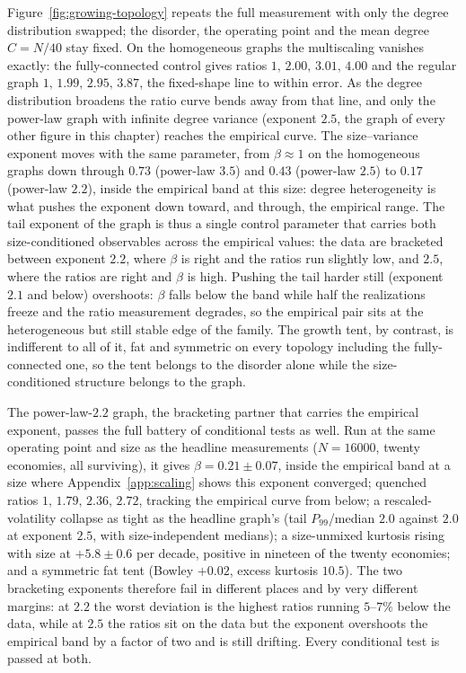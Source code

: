Figure~\ref{fig:growing-topology} repeats the full measurement with only the degree
distribution swapped; the disorder, the operating point and the mean degree $C = N/40$
stay fixed. On the homogeneous graphs the
multiscaling vanishes exactly: the fully-connected control gives ratios
$1,\,2.00,\,3.01,\,4.00$ and the regular graph $1,\,1.99,\,2.95,\,3.87$, the
fixed-shape line to within error. As the degree distribution broadens the ratio curve
bends away from that line, and only the power-law graph with infinite degree variance
(exponent $2.5$, the graph of every other figure in this chapter) reaches the empirical
curve. The size--variance exponent moves with the same parameter, from $\beta \approx 1$ on
the homogeneous graphs down through $0.73$ (power-law $3.5$) and $0.43$ (power-law $2.5$)
to $0.17$ (power-law $2.2$), inside the empirical band at this size:
degree heterogeneity is what pushes the exponent down toward, and through, the empirical
range. The tail exponent of the graph is thus a single control parameter that carries both
size-conditioned observables across the empirical values: the data are bracketed
between exponent $2.2$, where $\beta$ is right and the ratios run slightly low, and
$2.5$, where the ratios are right and $\beta$ is high. Pushing the tail harder still
(exponent $2.1$ and below) overshoots: $\beta$ falls below the band while half the
realizations freeze and the ratio measurement degrades, so the empirical pair sits at
the heterogeneous but still stable edge of the family. The
growth tent, by contrast, is indifferent to all of it, fat and symmetric on every
topology including the fully-connected one, so the tent belongs to the disorder alone
while the size-conditioned structure belongs to the graph.

The power-law-$2.2$ graph, the bracketing partner that carries the empirical exponent,
passes the full battery of conditional tests as well. Run at the same operating point
and size as the headline measurements ($N = 16000$, twenty economies, all surviving),
it gives $\beta = 0.21 \pm 0.07$, inside the empirical band at a size where
Appendix~\ref{app:scaling} shows this exponent converged; quenched ratios
$1,\,1.79,\,2.36,\,2.72$, tracking the empirical curve from below; a
rescaled-volatility collapse as tight as the headline graph's (tail $P_{99}$/median
$2.0$ against $2.0$ at exponent $2.5$, with size-independent medians); a size-unmixed
kurtosis rising with size at $+5.8 \pm 0.6$ per decade, positive in nineteen of the
twenty economies; and a symmetric fat tent (Bowley $+0.02$, excess kurtosis $10.5$).
The two bracketing exponents therefore fail in different places and by very different
margins: at $2.2$ the worst deviation is the highest ratios running $5$--$7\%$ below
the data, while at $2.5$ the ratios sit on the data but the exponent overshoots the
empirical band by a factor of two and is still drifting. Every conditional test is
passed at both.

